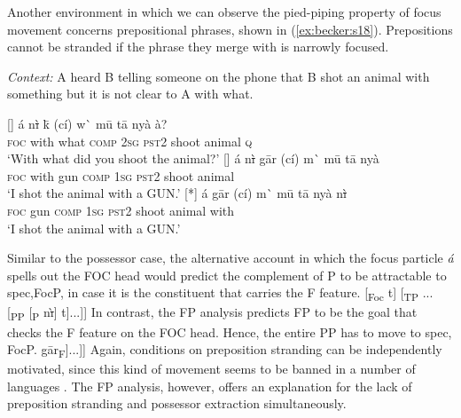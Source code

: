\documentclass[output=paper,
modfonts
]{langscibook}
\begin{document}
Another environment in which we can observe the pied-piping property of focus movement concerns prepositional phrases, shown in (\ref{ex:becker:s18}). Prepositions cannot be stranded if the phrase they merge with is narrowly focused.
\begin{exe}
\ex \textit{Context:} A heard B telling someone on the phone that B shot an animal with something but it is not clear to A with what.\label{ex:becker:s18}
\begin{xlist}
[]{
\gll \'a n\sout{\`i} k\=\textepsilon{} (c\'i) w\`\textepsilon{} m\=u t\=a ny\`a \`a? \\  
   \textsc{foc} with what \textsc{comp} \textsc{2sg} \textsc{pst2} shoot animal \textsc{q}    \\ 
\glt `With what did you shoot the animal?'}
[]{
\gll \'a n\sout{\`i} g\=ar (c\'i) m\`\textepsilon{} m\=u t\=a ny\`a \\  
     \textsc{foc} with gun \textsc{comp} \textsc{1sg} \textsc{pst2} shoot animal  \\ 
\glt `I shot the animal with a GUN.'}
[*]{
\gll \'a g\=ar (c\'i) m\`\textepsilon{} m\=u t\=a ny\`a n\sout{\`i} \\  
     \textsc{foc} gun \textsc{comp} \textsc{1sg} \textsc{pst2} shoot animal with \\ 
\glt `I shot the animal with a GUN.'}
\end{xlist}
\end{exe}
Similar to the possessor case, the alternative account in which the focus particle {\em \'a} spells out the FOC head would predict the complement of P to be attractable to spec,FocP, in case it is the constituent that carries the F feature.
\ea *[... \'a\sub{1} [\textsubscript{FocP} [\textsubscript{DP} \textipa{N}g\tikzmark{s19f}\=ar\textsubscript{F}] [\textsubscript{Foc} t] [\textsubscript{TP} ... [\textsubscript{PP} [\textsubscript{P} n\sout{\`{\i}}] t]...]]
	 \label{ex:becker:s19}
\z
\vspace{3mm}
In contrast, the FP analysis predicts FP to be the goal that checks the F feature on the FOC head. Hence, the entire PP has to move to spec, FocP.
\ea \relax[\textsubscript{FocP} \tikzmark{s20f2}\hspace{2mm}\tikzmark{s20f} [\textsubscript{Foc} c\'i] [\textsubscript{TP} ... [$_{F\tikzmark{s20t}P}$ \'a [\textsubscript{PP} [\textsubscript{P} n\sout{\`{\i}}] g\=ar\textsubscript{F}]...]]
     \label{ex:becker:s20}
\z
\vspace{6mm}
Again, conditions on preposition stranding can be independently motivated, since this kind of movement seems to be banned in a number of languages \citep{Abels2003,Heck2008}. The FP analysis, however, offers an explanation for the lack of preposition stranding and possessor extraction simultaneously.
\end{document}
